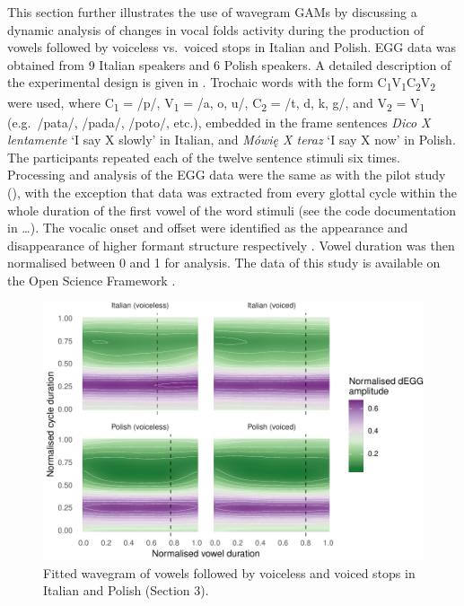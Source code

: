 \documentclass[
  11pt,
  a4paper,
]{article}
\begin{document}
\label{s:voicing}

This section further illustrates the use of wavegram GAMs by discussing
a dynamic analysis of changes in vocal folds activity during the
production of vowels followed by voiceless vs.~voiced stops in Italian
and Polish. EGG data was obtained from 9 Italian speakers and 6 Polish
speakers. A detailed description of the experimental design is given in
\citet{coretta2018j}. Trochaic words with the form
C\textsubscript{1}V\textsubscript{1}C\textsubscript{2}V\textsubscript{2}
were used, where C\textsubscript{1} = /p/, V\textsubscript{1} = /a, o,
u/, C\textsubscript{2} = /t, d, k, g/, and V\textsubscript{2} =
V\textsubscript{1} (e.g.~/pata/, /pada/, /poto/, etc.), embedded in the
frame sentences \emph{Dico X lentamente} `I say X slowly' in Italian,
and \emph{Mówię X teraz} `I say X now' in Polish. The participants
repeated each of the twelve sentence stimuli six times. Processing and
analysis of the EGG data were the same as with the pilot study
(), with the exception that data was extracted from every
glottal cycle within the whole duration of the first vowel of the word
stimuli (see the code documentation in \ldots{}). The vocalic onset and
offset were identified as the appearance and disappearance of higher
formant structure respectively \citep{machac2009}. Vowel duration was
then normalised between 0 and 1 for analysis. The data of this study is
available on the Open Science Framework \citet{coretta2018m}.

\begin{figure}
\includegraphics[width=\linewidth]{2019-wavegram_files/figure-latex/surface-1} \caption{Fitted wavegram of vowels followed by voiceless and voiced stops in Italian and Polish (Section 3).}\label{f:surface}
\end{figure}
\end{document}
